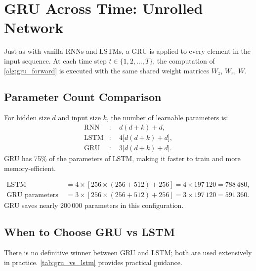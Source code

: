 \documentclass[12pt,a4paper]{article}
\begin{document}
\section{GRU Across Time: Unrolled Network}
\label{sec:unrolled}

Just as with vanilla RNNs and LSTMs, a GRU is applied to every element in the input sequence.
At each time step $t \in \{1, 2, \ldots, T\}$, the computation of \cref{alg:gru_forward} is
executed with the same shared weight matrices $W_z$, $W_r$, $W$.

\subsection{Parameter Count Comparison}

For hidden size $d$ and input size $k$, the number of learnable parameters is:
\begin{align}
  \text{RNN} &: \quad d(d+k) + d, \\
  \text{LSTM} &: \quad 4\bigl[d(d+k) + d\bigr], \\
  \text{GRU} &: \quad 3\bigl[d(d+k) + d\bigr].
\end{align}
GRU has 75\% of the parameters of LSTM, making it faster to train and more memory-efficient.

\begin{example}[title=Parameter Count for $d=256$, $k=512$]
\begin{align*}
  \text{LSTM parameters} &= 4 \times [256 \times (256+512) + 256]
                           = 4 \times 197\,120 = 788\,480, \\
  \text{GRU parameters}  &= 3 \times [256 \times (256+512) + 256]
                           = 3 \times 197\,120 = 591\,360.
\end{align*}
GRU saves nearly 200\,000 parameters in this configuration.
\end{example}

\subsection{When to Choose GRU vs LSTM}

There is no definitive winner between GRU and LSTM; both are used extensively in practice.
\cref{tab:gru_vs_lstm} provides practical guidance.
\end{document}
